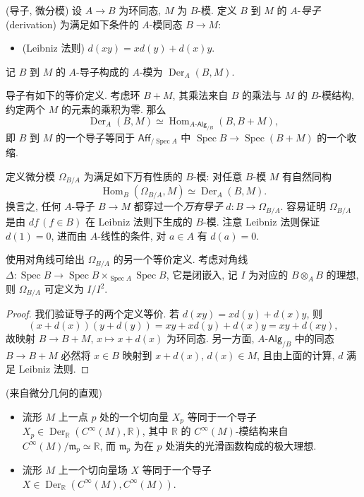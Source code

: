 \documentclass{book}
\begin{document}
	\begin{propdef}
		{(导子, 微分模)}
		设 $A\to B$ 为环同态, $M$ 为 $B$-模. 定义 $B$ 到 $M$ 的 $A$-\emph{导子} (derivation) 为满足如下条件的 $A$-模同态 $B\to M$:
		\begin{itemize}
			\item (Leibniz 法则) $d(xy)=xd(y)+d(x)y$.
		\end{itemize}
		记 $B$ 到 $M$ 的 $A$-导子构成的 $A$-模为 $\operatorname{Der}_A(B,M)$.
		
		导子有如下的等价定义. 考虑环 $B+M$, 其乘法来自 $B$ 的乘法与 $M$ 的 $B$-模结构, 约定两个 $M$ 的元素的乘积为零. 那么
		$$
		\operatorname{Der}_A(B,M) \simeq \operatorname{Hom}_{A\text{-}\mathsf{Alg}_{/B}}(B,B+M),
		$$
		即 $B$ 到 $M$ 的一个导子等同于 $\mathsf{Aff}_{/\operatorname{Spec} A}$ 中 $\operatorname{Spec} B \to \operatorname{Spec} (B+M)$ 的一个收缩.
		
		定义微分模 $\Omega_{B/A}$ 为满足如下万有性质的 $B$-模: 对任意 $B$-模 $M$ 有自然同构
		$$
		\operatorname{Hom}_B(\Omega_{B/A},M)\simeq\operatorname{Der}_A(B,M).
		$$
		换言之, 任何 $A$-导子 $B\to M$ 都穿过一个\emph{万有导子} $d\colon B\to\Omega_{B/A}$.
		容易证明 $\Omega_{B/A}$ 是由 $df\,(f\in B)$ 在 Leibniz 法则下生成的 $B$-模. 注意 Leibniz 法则保证 $d(1)=0$, 进而由 $A$-线性的条件, 对 $a\in A$ 有 $d(a)=0$.
		
		使用对角线可给出 $\Omega_{B/A}$ 的另一个等价定义. 考虑对角线 $\Delta \colon \operatorname{Spec} B\to \operatorname{Spec} B\times_{\operatorname{Spec} A}\operatorname{Spec} B$, 它是闭嵌入, 记 $I$ 为对应的 $B\otimes_A B$ 的理想, 则 $\Omega_{B/A}$ 可定义为 $I/I^2$.
	\end{propdef}
	\begin{proof}
		我们验证导子的两个定义等价.
		若 $d(xy)=xd(y)+d(x)y$, 则
		$$
		(x+d(x))(y+d(y)) = xy + xd(y) + d(x)y = xy+d(xy),
		$$
		故映射 $B\to B+M,\,x\mapsto x+d(x)$ 为环同态. 另一方面, $A\text{-}\mathsf{Alg}_{/B}$ 中的同态 $B\to B+M$ 必然将 $x\in B$ 映射到 $x+d(x)$, $d(x)\in M$, 且由上面的计算, $d$ 满足 Leibniz 法则.
	\end{proof}
	
	\begin{example}
		{(来自微分几何的直观)}
		\begin{itemize}
			\item 流形 $M$ 上一点 $p$ 处的一个切向量 $X_p$ 等同于一个导子 $X_p\in \operatorname{Der}_{\mathbb R}(C^\infty(M),\mathbb R)$,
			其中 $\mathbb R$ 的 $C^\infty(M)$-模结构来自 $C^\infty(M)/\mathfrak m_p\simeq\mathbb R$, 而 $\mathfrak m_p$ 为在 $p$ 处消失的光滑函数构成的极大理想.
			\item 流形 $M$ 上一个切向量场 $X$ 等同于一个导子 $X\in\operatorname{Der}_{\mathbb R}(C^\infty(M),C^\infty(M))$.
		\end{itemize}
	\end{example}
	
\end{document}
